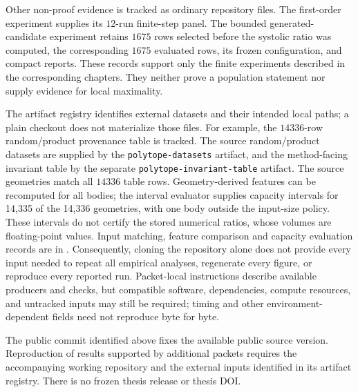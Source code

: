 Other non-proof evidence is tracked as ordinary repository files. The
first-order experiment supplies its
\(12\)-run finite-step panel.  The bounded generated-candidate experiment
retains \(1675\) rows selected before the systolic ratio was computed, the
corresponding \(1675\) evaluated rows, its frozen configuration, and compact
reports.  These records support only the finite experiments described in the
corresponding chapters.  They neither prove a population statement nor supply
evidence for local maximality.

The artifact registry identifies external datasets and their intended local
paths; a plain checkout does not materialize those files. For example, the
\(14336\)-row random/product provenance table is tracked. The source
random/product datasets are supplied by the \texttt{polytope-datasets}
artifact, and the method-facing invariant table by the separate
\texttt{polytope-invariant-table} artifact. The source geometries match all
\(14336\) table rows. Geometry-derived features can be recomputed for all
bodies; the interval evaluator supplies capacity intervals for 14,335 of the
14,336 geometries, with one body outside the input-size policy. These intervals
do not certify the stored numerical ratios, whose volumes are floating-point
values. Input matching, feature comparison and capacity evaluation records are in
.
Consequently, cloning the repository alone does not provide every input needed
to repeat all empirical analyses, regenerate every figure, or reproduce every
reported run.  Packet-local instructions describe available producers and
checks, but compatible software, dependencies, compute resources, and
untracked inputs may still be required; timing and other
environment-dependent fields need not reproduce byte for byte.

The public commit identified above fixes the available public source version.
Reproduction of results supported by additional packets requires the accompanying
working repository and the external inputs identified in its artifact registry.
There is no frozen thesis release or thesis DOI.
